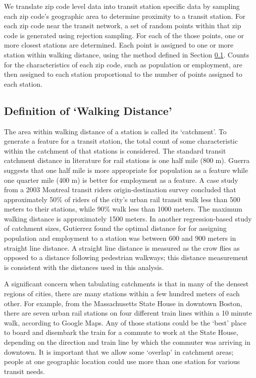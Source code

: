 \documentclass[11pt]{article}
\begin{document}
We translate zip code level data into transit station specific data by sampling each zip code's geographic area to determine proximity to a transit station. For each zip code near the transit network, a set of random points within that zip code is generated using rejection sampling. For each of the those points, one or more closest stations are determined. Each point is assigned to one or more station within walking distance, using the method defined in Section \ref{sec:walk}. Counts for the characteristics of each zip code, such as population or employment, are then assigned to each station proportional to the number of points assigned to each station.

\subsection{Definition of `Walking Distance'}\label{sec:walk}

The area within walking distance of a station is called its `catchment'. To generate a feature for a transit station, the total count of some characteristic within the catchment of that stations is considered. The standard transit catchment distance in literature for rail stations is one half mile (800 m). Guerra \cite{Guerra2012} suggests that one half mile is more appropriate for population as a feature while one quarter mile (400 m) is better for employment as a feature. A case study \cite{ElGeneidy2014} from a 2003 Montreal transit riders origin-destination survey concluded that approximately 50\% of riders of the city's urban rail transit walk less than 500 meters to their stations, while 90\% walk less than 1000 meters. The maximum walking distance is approximately 1500 meters. In another regression-based study of catchment sizes, Gutierrez \cite{Gutierrez2011} found the optimal distance for  for assigning population and employment to a station was between 600 and 900 meters in straight line distance. A straight line distance is measured as the crow flies as opposed to a distance following pedestrian walkways; this distance measurement is consistent with the distances used in this analysis.

A significant concern when tabulating catchments is that in many of the densest regions of cities, there are many stations within a few hundred meters of each other. For example, from the Massachusetts State House in downtown Boston, there are seven urban rail stations on four different train lines within a 10 minute walk, according to Google Maps. Any of those stations could be the `best' place to board and disembark the train for a commute to work at the State House, depending on the direction and train line by which the commuter was arriving in downtown. It is important that we allow some `overlap' in catchment areas; people at one geographic location could use more than one station for various transit needs. 
\end{document}
